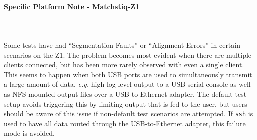 \paragraph{Specific Platform Note - Matchstiq-Z1}
~\\
\\
Some tests have had ``Segmentation Faults'' or ``Alignment Errors'' in certain scenarios on the Z1. The problem becomes most evident when there are multiple clients connected, but has been more rarely observed with even a single client. This seems to happen when both USB ports are used to simultaneously transmit a large amount of data, \textit{e.g.} high log-level output to a USB serial console as well as NFS-mounted output files over a USB-to-Ethernet adapter. The default test setup avoids triggering this by limiting output that is fed to the user, but users should be aware of this issue if non-default test scenarios are attempted. If \texttt{ssh} is used to have all data routed through the USB-to-Ethernet adapter, this failure mode is avoided.\par

\pagebreak

